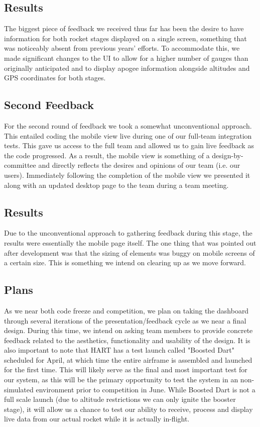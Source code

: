 \documentclass[journal,10pt,onecolumn,compsoc]{IEEEtran}
\begin{document}
	\subsection{Results}
		The biggest piece of feedback we received thus far has been the desire to have information for both rocket stages displayed on a single screen, something that was noticeably absent from previous years' efforts.
		To accommodate this, we made significant changes to the UI to allow for a higher number of gauges than originally anticipated and to display apogee information alongside altitudes and GPS coordinates for both stages. 
	
  \subsection{Second Feedback}
    For the second round of feedback we took a somewhat unconventional approach.
    This entailed coding the mobile view live during one of our full-team integration tests. 
    This gave us access to the full team and allowed us to gain live feedback as the code progressed.
    As a result, the mobile view is something of a design-by-committee and directly reflects the desires and opinions of our team (i.e. our users).
    Immediately following the completion of the mobile view we presented it along with an updated desktop page to the team during a team meeting.
    
  \subsection{Results}
    Due to the unconventional approach to gathering feedback during this stage, the results were essentially the mobile page itself.
    The one thing that was pointed out after development was that the sizing of elements was buggy on mobile screens of a certain size.
    This is something we intend on clearing up as we move forward.
  
	\subsection{Plans}
		As we near both code freeze and competition, we plan on taking the dashboard through several iterations of the presentation/feedback cycle as we near a final design.
		During this time, we intend on asking team members to provide concrete feedback related to the aesthetics, functionality and usability of the design.
		It is also important to note that HART has a test launch called "Boosted Dart" scheduled for April, at which time the entire airframe is assembled and launched for the first time.
		This will likely serve as the final and most important test for our system, as this will be the primary opportunity to test the system in an non-simulated environment prior to competition in June.
		While Boosted Dart is not a full scale launch (due to altitude restrictions we can only ignite the booster stage), it will allow us a chance to test our ability to receive, process and display live data from our actual rocket while it is actually in-flight.
		
\end{document}

